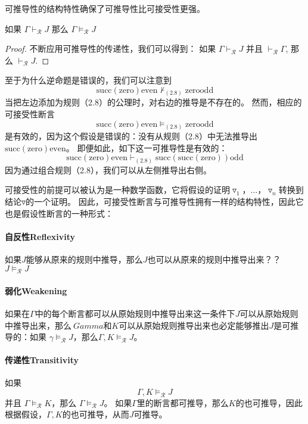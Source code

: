 可推导性的结构特性确保了可推导性比可接受性更强。

\begin{theorem}[]
    如果 $\Gamma \vdash_{\mathcal{R}} J$ 那么 $\Gamma \vDash_{\mathcal{R}} J$
\end{theorem}

\begin{proof}
    不断应用可推导性的传递性，我们可以得到：
    如果 $\Gamma \vdash_{\mathcal{R}} J$ 并且 $\vdash_{\mathcal{R}} \Gamma$, 
    那么 $\vdash_{\mathcal{R}} J$.
\end{proof}

至于为什么逆命题是错误的，我们可以注意到
$$\text{succ}(\text{zero}) \text{even} \nvdash_{(2.8)} \text{zero} \text{odd}$$
当把左边添加为规则（2.8）的公理时，对右边的推导是不存在的。
然而，相应的可接受性断言
$$\text{succ}(\text{zero}) \text{even} \vDash_{(2.8)} \text{zero} \text{odd}$$
是有效的，因为这个假设是错误的：没有从规则（2.8）中无法推导出$\text{succ}(\text{zero}) \text{even}$。
即便如此，如下这一可推导性是有效的：
$$\text{succ}(\text{zero}) \text{even} \vdash_{(2.8)} \text{succ}(\text{succ}(\text{zero})) \text{odd} $$
因为通过组合规则（2.8），我们可以从左侧推导出右侧。

可接受性的前提可以被认为是一种数学函数，它将假设的证明$ \triangledown_1，\dots，\triangledown_n $转换到结论$ \triangledown $的一个证明。
因此，可接受性断言与可推导性拥有一样的结构特性，因此它也是假设性断言的一种形式：

\paragraph{自反性Reflexivity} 
如果$J$能够从原来的规则中推导，那么$J$也可以从原来的规则中推导出来？？$J \vDash_{\mathcal{R}} J$

\paragraph{弱化Weakening} 
如果在$ \Gamma $中的每个断言都可以从原始规则中推导出来这一条件下$ J $可以从原始规则中推导出来，那么$ \ Gamma $和$ K $可以从原始规则推导出来也必定能够推出$ J $是可推导的：如果 $\gamma \vDash_{\mathcal{R}} J$，那么$\Gamma,K \vDash_{\mathcal{R}} J$。

\paragraph{传递性Transitivity} 
如果 $$\Gamma,K \vDash_{\mathcal{R}} J$$ 并且 $\Gamma \vDash_{\mathcal{R}} K$，那么 $\Gamma \vDash_{\mathcal{R}} J$。 如果$\Gamma$里的断言都可推导，那么$K$的也可推导，因此根据假设，$\Gamma,K$的也可推导，从而$J$可推导。

